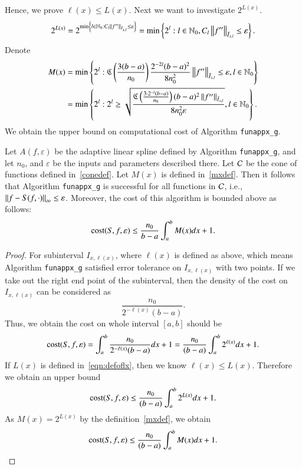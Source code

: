 Hence, we prove $\ell(x) \le L(x)$. Next we want to investigate $2^{L(x)}$.
$$
2^{L(x)}=2^{\min \left\{ l \in \natzero : C_l  \norm[\bar{I}_{x,l}]{f''} \le \varepsilon\right\}} = \min\left\{2^l: l \in  \natzero, C_l \norm[\bar{I}_{x,l}]{f''} \le \varepsilon\right\}.$$
Denote
\begin{align}\label{mxdef}
M(x) & = \min\left\{2^l:  \fC\left(\frac{3(b-a)}{n_0}\right) \frac{2^{-2l}(b-a)^2}{8n^2_0} \norm[\bar{I}_{x,l}]{f''}  \le \varepsilon,  l \in  \natzero\right\}\nonumber \\
 & = \min\left\{2^l:  2^l \ge \sqrt{\frac{\fC\left(\frac{3 \cdot 2^{-l}(b-a)}{n_0}\right)  (b-a)^2  \norm[\bar{I}_{x,l}]{f''} }{8n^2_0\varepsilon}},  l \in  \natzero\right\}.
\end{align}
We obtain the upper bound on computational cost of Algorithm \texttt{funappx\_g}.

\begin{theorem}\label{thm:cost}
Let $A(f,\varepsilon)$ be the adaptive linear spline defined by Algorithm \textnormal{\texttt{funappx\_g}}, and let $n_0$, and $\varepsilon$ be the inputs and parameters described there. Let $\cc$ be the cone of functions defined in~\eqref{conedef}.
Let $M(x)$ is defined in~\eqref{mxdef}.
Then it follows that Algorithm \textnormal{\texttt{funappx\_g}} is successful for all functions in $\cc$,  i.e.,  $\norm[\infty]{f - S(f, \cdot)} \le \varepsilon$.  Moreover, the cost of this algorithm is bounded above as follows:
$$\cost(S,f,\varepsilon) \le \frac{n_0}{b-a}\int_a^b M(x) dx +1.$$
\end{theorem}

\begin{proof}
For subinterval $I_{x,\ell(x)}$, where $\ell(x)$ is defined as above,
which means Algorithm \texttt{funappx\_g} satisfied error tolerance on $I_{x,\ell(x)}$ with two points.
If we take out the right end point of the subinterval, then the density of the cost on $I_{x,\ell(x)}$ can be considered as
$$\frac{n_0}{2^{-\ell(x)}(b-a)}.$$
Thus, we obtain the cost on whole interval $[a,b]$ should be
$$\cost(S,f,\varepsilon)  = \int_a^b \frac{n_0}{2^{-\ell(x)}(b-a)}dx +1= \frac{n_0}{(b-a)}\int_a^b 2^{\ell(x)}dx +1.
$$
If $L(x)$ is defined in~\eqref{eqn:defoflx}, then we know $\ell(x) \le L(x)$. Therefore we obtain an upper bound
$$\cost(S,f,\varepsilon)  \le \frac{n_0}{(b-a)}\int_a^b 2^{L(x)}dx +1.
$$
As $M(x)=2^{L(x)}$ by the definition~\eqref{mxdef}, we obtain
$$\cost(S,f,\varepsilon)  \le \frac{n_0}{(b-a)}\int_a^b M(x) dx +1.
$$
\end{proof}

